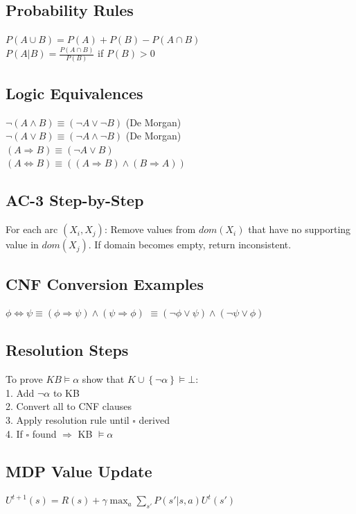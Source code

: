 \documentclass[8pt,landscape,a4paper]{article}
\begin{document}
\begin{multicols*}{3}
\subsection{Probability Rules}
$P(A \cup B) = P(A) + P(B) - P(A \cap B)$\\
$P(A|B) = \frac{P(A \cap B)}{P(B)}$ if $P(B) > 0$

\subsection{Logic Equivalences}
$\neg(A \wedge B) \equiv (\neg A \vee \neg B)$ (De Morgan)\\
$\neg(A \vee B) \equiv (\neg A \wedge \neg B)$ (De Morgan)\\
$(A \Rightarrow B) \equiv (\neg A \vee B)$\\
$(A \Leftrightarrow B) \equiv ((A \Rightarrow B) \wedge (B \Rightarrow A))$

\subsection{AC-3 Step-by-Step}
For each arc $(X_i, X_j)$: Remove values from $dom(X_i)$ that have no supporting value in $dom(X_j)$. If domain becomes empty, return inconsistent.

\subsection{CNF Conversion Examples}
$\phi \Leftrightarrow \psi \equiv (\phi \Rightarrow \psi) \wedge (\psi \Rightarrow \phi)$
$\equiv (\neg\phi \vee \psi) \wedge (\neg\psi \vee \phi)$

\subsection{Resolution Steps}
To prove $KB \models \alpha$ show that $K\cup\left\{\neg\alpha\right\}\models\bot $:\\
1. Add $\neg\alpha$ to KB\\
2. Convert all to CNF clauses\\
3. Apply resolution rule until $\square$ derived\\
4. If $\square$ found $\Rightarrow$ KB $\models \alpha$

\subsection{MDP Value Update}
$U^{t+1}(s) = R(s) + \gamma \max_a \sum_{s'} P(s'|s,a) U^t(s')$


\end{multicols*}
\end{document}
